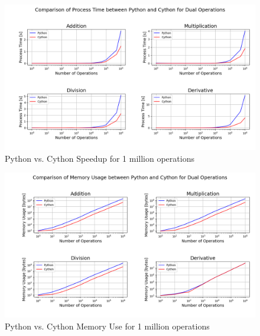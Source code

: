 \begin{figure}[h]
    \centering
    \includegraphics[width=1\textwidth]{images/basic_ops_speedup.png}
    \caption{Python vs. Cython Speedup for 1 million operations}
    \label{fig:basic_ops_speedup}
\end{figure}

\begin{figure}[h]
    \centering
    \includegraphics[width=1\textwidth]{images/basic_ops_memory.png}
    \caption{Python vs. Cython Memory Use for 1 million operations}
    \label{fig:basic_ops_memory}
\end{figure}

